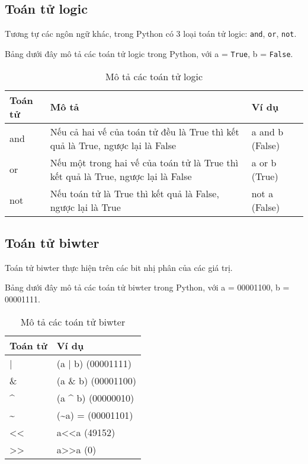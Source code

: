 \subsection{Toán tử logic}
\label{logic}
Tương tự các ngôn ngữ khác, trong Python có 3 loại toán tử logic: \texttt{and}, \texttt{or}, \texttt{not}.\par
Bảng dưới đây mô tả các toán tử logic trong Python, với a = \texttt{True}, b = \texttt{False}.
\begin{table}[h]
	\centering
	\begin{tabular}{|l||l||l|}
		\hline
		Toán tử & Mô tả & Ví dụ \\
		\hline
		and & Nếu cả hai vế của toán tử đều là True thì kết quả là True, ngược lại là False & a and b (False) \\
		\hline
		or  & Nếu một trong hai vế của toán tử là True thì kết quả là True, ngược lại là False & a or b (True) \\
		\hline
		not & Nếu toán tử là True thì kết quả là False, ngược lại là True & not a (False) \\
		\hline
	\end{tabular}
	\caption{Mô tả các toán tử logic}
\end{table}
\subsection{Toán tử biwter}
Toán tử biwter thực hiện trên các bit nhị phân của các giá trị.\par
Bảng dưới đây mô tả các toán tử biwter trong Python, với a = 00001100, b = 00001111.
\begin{table}[h]
	\centering
	\begin{tabular}{|l||l|}
		\hline
		Toán tử & Ví dụ \\
		\hline
		| & (a | b) (00001111) \\
		\hline
		\& & (a \& b) (00001100) \\
		\hline
		\^{} & (a \^{} b) (00000010)  \\
		\hline
		\~{} & (\~{}a) = (00001101) \\
		\hline
		<< & a<<a  (49152) \\
		\hline
		>> & a>>a (0) \\
		\hline
	\end{tabular}
	\caption{Mô tả các toán tử biwter}
\end{table}
\newpage
